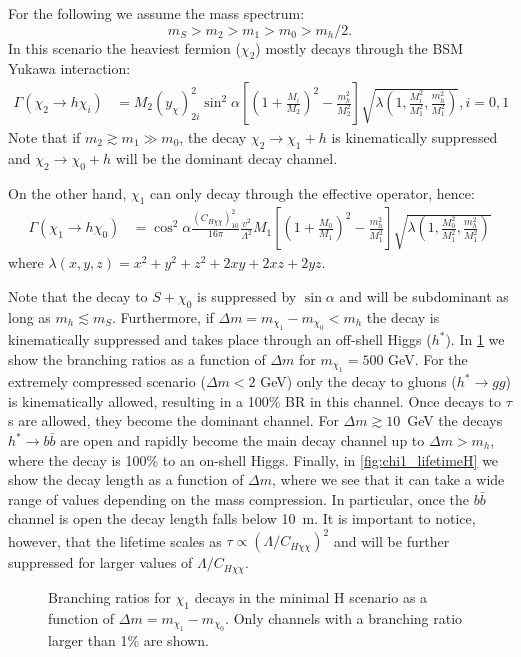 \documentclass[a4paper,11pt]{article}
\begin{document}
For the following we assume the mass spectrum:
$$
m_S > m_2 > m_1 > m_0 > m_h/2.
$$
In this scenario the heaviest fermion ($\chi_2$) mostly decays through the BSM Yukawa interaction:
\begin{align}
	\Gamma (\chi_2 \to h \chi_i) & = M_ 2 \left(y_\chi\right)_{2i}^2 \sin^2\alpha \left[\left(1 + \frac{M_i}{M_2}\right)^2 - \frac{m_h^2}{M_2^2} \right]  \sqrt{\lambda\left(1,\frac{M_i^2}{M_1^2},\frac{m_h^2}{M_1^2}\right)}, i=0,1
\end{align}
Note that if $m_2 \gtrsim m_1 \gg m_0$, the decay $\chi_2 \to \chi_1 + h$ is kinematically suppressed and $\chi_2 \to \chi_0 + h$ will be the dominant decay channel.

On the other hand, $\chi_1$ can only decay through the effective operator, hence:
\begin{align}
	\Gamma (\chi_1 \to h \chi_0) & = \cos^2\alpha \frac{\left(C_{H\chi\chi}\right)_{10}^2}{16 \pi} \frac{v^2}{\Lambda^2} M_1 \left[\left(1 + \frac{M_0}{M_1}\right)^2 - \frac{m_h^2}{M_1^2} \right]  \sqrt{\lambda\left(1,\frac{M_0^2}{M_1^2},\frac{m_h^2}{M_1^2}\right)}
\end{align} 
where $\lambda(x,y,z) = x^2 + y^2 + z^2 + 2 x y + 2 x z + 2 y z$.


Note that the decay to $S + \chi_0$ is suppressed by $\sin\alpha$ and will be subdominant as long as $m_h \lesssim m_S$.
Furthermore, if $\Delta m = m_{\chi_1} - m_{\chi_0}  < m_h$ the decay is kinematically suppressed and takes place through an off-shell Higgs ($h^*$). In \cref{fig:chi1_decayH} we show the branching ratios as a function of $\Delta m$ for $m_{\chi_1} = 500$ GeV.
For the extremely compressed scenario ($\Delta m < 2$ GeV) only the decay to gluons ($h^* \to g g$) is kinematically allowed, resulting in a 100\% BR in this channel. Once decays to $\tau$s are allowed, they become the dominant channel. For $\Delta m \gtrsim 10$~GeV the decays $h^* \to b \bar{b}$ are open and rapidly become the main decay channel up to $\Delta m > m_h$, where the decay is 100\% to an on-shell Higgs.
Finally, in \cref{fig:chi1_lifetimeH} we show the decay length as a function of $\Delta m$, where we see that it can take a wide range of values depending on the mass compression. In particular, once the $b \bar{b}$ channel is open the decay length falls below 10~m. It is important to notice, however, that the lifetime scales as  $\tau \propto \left(\Lambda/C_{H\chi\chi}\right)^2$ and will be further suppressed for larger values of $\Lambda/C_{H\chi\chi}$.

\begin{figure}
	\centering
	\caption{Branching ratios for $\chi_1$ decays in the minimal H scenario as a function of $\Delta m = m_{\chi_1} - m_{\chi_0}$. Only channels with a branching ratio larger than 1\% are shown.} \label{fig:chi1_decayH}
\end{figure}
\end{document}
